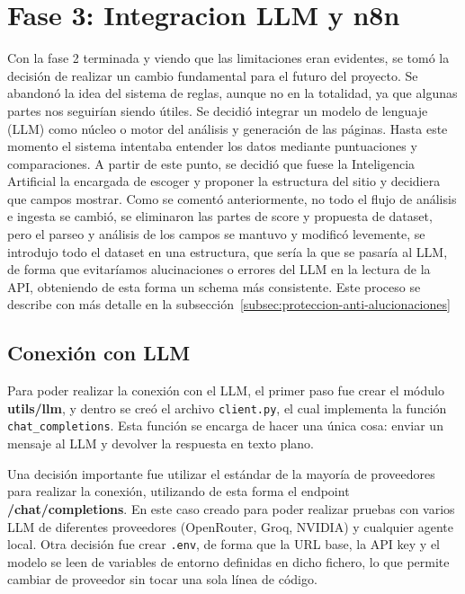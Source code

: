 \section{Fase 3: Integracion LLM y n8n}
\label{sec:integracion-llm-n8n}

Con la fase 2 terminada y viendo que las limitaciones eran evidentes, se tomó la decisión de realizar un cambio fundamental para el futuro del proyecto. Se abandonó 
la idea del sistema de reglas, aunque no en la totalidad, ya que algunas partes nos seguirían siendo útiles. Se decidió integrar un
modelo de lenguaje (LLM) como núcleo o motor del análisis y generación de las páginas. Hasta este momento el sistema intentaba entender los datos mediante
puntuaciones y comparaciones. A partir de este punto, se decidió que fuese la Inteligencia Artificial la encargada de escoger y proponer la estructura del sitio y decidiera que 
campos mostrar. Como se comentó anteriormente, no todo el flujo de análisis e ingesta se cambió, se eliminaron las partes de score y propuesta de dataset, pero el parseo 
y análisis de los campos se mantuvo y modificó levemente, se introdujo todo el dataset en una estructura, que sería la que se pasaría al LLM, de forma que evitaríamos
alucinaciones o errores del LLM en la lectura de la API, obteniendo de esta forma un schema más consistente. Este proceso se describe con más detalle en la subsección~\ref{subsec:proteccion-anti-alucionaciones}


\subsection{Conexión con LLM}
\label{subsec:conexion-llm}

Para poder realizar la conexión con el LLM, el primer paso fue crear el módulo \textbf{utils/llm}, y dentro se creó el archivo \texttt{client.py}, el cual
implementa la función \texttt{chat\_completions}. Esta función se encarga de hacer una única cosa: enviar un mensaje al LLM y devolver la respuesta en texto
plano.

Una decisión importante fue utilizar el estándar de la mayoría de proveedores para realizar la conexión, utilizando de esta forma el endpoint \textbf{/chat/completions}. En este caso creado para poder realizar pruebas con varios LLM de diferentes proveedores (OpenRouter, Groq, NVIDIA) y cualquier agente local.
Otra decisión fue crear \texttt{.env}, de forma que la URL base, la API key y el modelo se leen de variables de entorno definidas en dicho fichero, lo que permite cambiar de proveedor sin tocar una sola línea de código.

